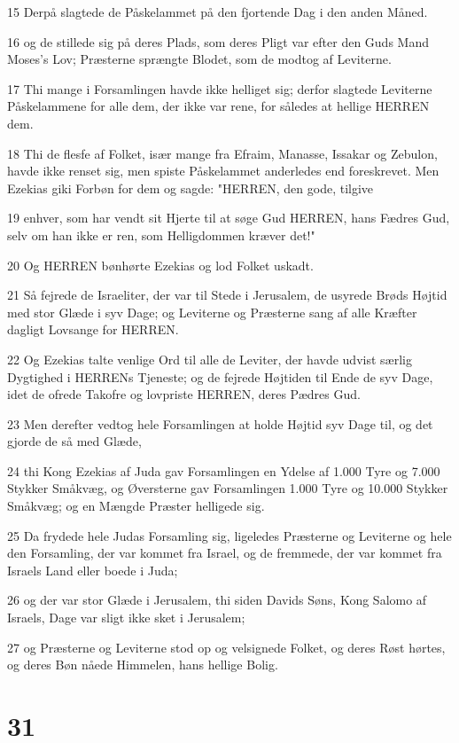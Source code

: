 \par 15 Derpå slagtede de Påskelammet på den fjortende Dag i den anden Måned.
\par 16 og de stillede sig på deres Plads, som deres Pligt var efter den Guds Mand Moses's Lov; Præsterne sprængte Blodet, som de modtog af Leviterne.
\par 17 Thi mange i Forsamlingen havde ikke helliget sig; derfor slagtede Leviterne Påskelammene for alle dem, der ikke var rene, for således at hellige HERREN dem.
\par 18 Thi de flesfe af Folket, især mange fra Efraim, Manasse, Issakar og Zebulon, havde ikke renset sig, men spiste Påskelammet anderledes end foreskrevet. Men Ezekias giki Forbøn for dem og sagde: "HERREN, den gode, tilgive
\par 19 enhver, som har vendt sit Hjerte til at søge Gud HERREN, hans Fædres Gud, selv om han ikke er ren, som Helligdommen kræver det!"
\par 20 Og HERREN bønhørte Ezekias og lod Folket uskadt.
\par 21 Så fejrede de Israeliter, der var til Stede i Jerusalem, de usyrede Brøds Højtid med stor Glæde i syv Dage; og Leviterne og Præsterne sang af alle Kræfter dagligt Lovsange for HERREN.
\par 22 Og Ezekias talte venlige Ord til alle de Leviter, der havde udvist særlig Dygtighed i HERRENs Tjeneste; og de fejrede Højtiden til Ende de syv Dage, idet de ofrede Takofre og lovpriste HERREN, deres Pædres Gud.
\par 23 Men derefter vedtog hele Forsamlingen at holde Højtid syv Dage til, og det gjorde de så med Glæde,
\par 24 thi Kong Ezekias af Juda gav Forsamlingen en Ydelse af 1.000 Tyre og 7.000 Stykker Småkvæg, og Øversterne gav Forsamlingen 1.000 Tyre og 10.000 Stykker Småkvæg; og en Mængde Præster helligede sig.
\par 25 Da frydede hele Judas Forsamling sig, ligeledes Præsterne og Leviterne og hele den Forsamling, der var kommet fra Israel, og de fremmede, der var kommet fra Israels Land eller boede i Juda;
\par 26 og der var stor Glæde i Jerusalem, thi siden Davids Søns, Kong Salomo af Israels, Dage var sligt ikke sket i Jerusalem;
\par 27 og Præsterne og Leviterne stod op og velsignede Folket, og deres Røst hørtes, og deres Bøn nåede Himmelen, hans hellige Bolig.

\chapter{31}

